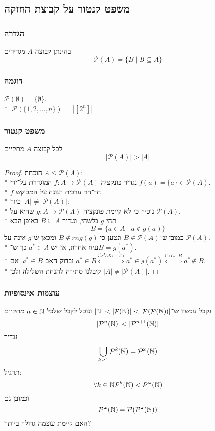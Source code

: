 \subsection{משפט קנטור על קבוצת החזקה}
\subsubsection{הגדרה}
בהינתן קבוצה $A$ מגדירים
\[
	\mathcal{P}(A) = \{ B \mid B \subseteq A \}
\]

\subsubsection{דוגמה}
$\mathcal{P}(\emptyset) = \{ \emptyset \}$. \\*
$| \mathcal{P}(\{1, 2, \dots, n \})| = |[2^n]|$

\subsubsection{משפט קנטור}
לכל קבוצה $A$ מתקיים
\[
	|\mathcal{P}(A)| > |A|
\]
\begin{proof}
	הוכחת $A \le \mathcal{P}(A)$: \\*
	נגדיר פונקציה $f : A \to \mathcal{P}(A)$ המוגדרת על־ידי $f(a) = \{a\} \in \mathcal{P}(A)$. \\*
	$f$ חד־חד ערכית ועונה על המבוקש.\\*
	כיוון $|A| \ne |\mathcal{P}(A)|$: \\*
	נוכיח כי לא קיימת פונקציה $g : A \to \mathcal{P}(A)$ שהיא על $\mathcal{P}(A)$. \\*
	תהי $g$ כלשהי, ונגדיר $B \subseteq A$ באופן הבא
	\[
		B = \{ a \in A \mid a \not\in g(a) \}
	\]
	כמובן ש־$B \in \mathcal{P}(A)$ ונטען כי $B \not\in rng(g)$ ומכאן ש־$g$ אינה על $\mathcal{P}(A)$. \\*
	נניח אחרת, אז יש $a^* \in A$ כך ש־$B = g(a^*)$. \\*
	נבדוק האם $a^* \in B$. אם $a^* \in B \overset{\text{הנחת השלילה}}{\iff} a^* \in g(a^*) \overset{\text{הגדרת $B$}}{\iff} a^* \not\in B$. \\*
	קיבלנו סתירה להנחת השלילה ולכן $|A| \ne |\mathcal{P}(A)|$.
\end{proof}

\subsubsection{עוצמות אינסופיות}
נקבל עכשיו ש־$|\mathbb{N}| < |\mathcal{P}(\mathbb{N})| < |\mathcal{P}(\mathcal{P}(\mathbb{N})) |$ ונוכל לקבל שלכל $n \in \mathbb{N}$ מתקיים
\[
	|\mathcal{P}^n(\mathbb{N})| < |\mathcal{P}^{n + 1}(\mathbb{N})|
\]
נגדיר
\[
	\bigcup_{k \ge 1} \mathcal{P}^k(\mathbb{N}) = \mathcal{P}^\omega(\mathbb{N})
\]
תרגיל:
\[
	\forall k \in \mathbb{N} \mathcal{P}^k(\mathbb{N}) < \mathcal{P}^\omega(\mathbb{N})
\]
וכמובן גם
\[
	\mathcal{P}^\omega(\mathbb{N}) = \mathcal{P}(\mathcal{P}^\omega(\mathbb{N}))
\]
האם קיימת עוצמה גדולה ביותר?

